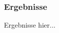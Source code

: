 \begin{frame} %
  \frametitle{Ergebnisse} %
  \begin{definition} %
    Ergebnisse hier...
  \end{definition}
\end{frame}